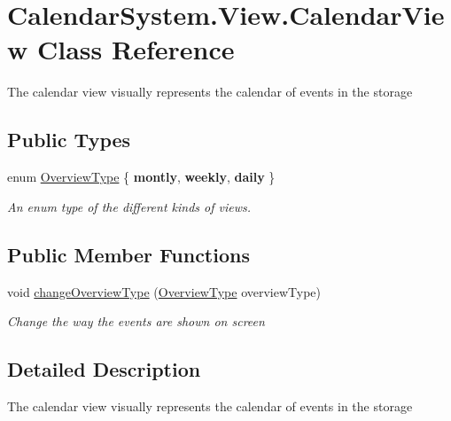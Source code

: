 \hypertarget{class_calendar_system_1_1_view_1_1_calendar_view}{\section{Calendar\+System.\+View.\+Calendar\+View Class Reference}
\label{class_calendar_system_1_1_view_1_1_calendar_view}
}


The calendar view visually represents the calendar of events in the storage  


\subsection*{Public Types}
\begin{DoxyCompactItemize}
\item 
enum \hyperlink{class_calendar_system_1_1_view_1_1_calendar_view_a48613707fc419f439edc9eddc1f81f7e}{Overview\+Type} \{ {\bfseries montly}, 
{\bfseries weekly}, 
{\bfseries daily}
 \}
\begin{DoxyCompactList}\small\item\em An enum type of the different kinds of views. \end{DoxyCompactList}\end{DoxyCompactItemize}
\subsection*{Public Member Functions}
\begin{DoxyCompactItemize}
\item 
void \hyperlink{class_calendar_system_1_1_view_1_1_calendar_view_a879886fb96fcb53e1f647d0ba00dd7d5}{change\+Overview\+Type} (\hyperlink{class_calendar_system_1_1_view_1_1_calendar_view_a48613707fc419f439edc9eddc1f81f7e}{Overview\+Type} overview\+Type)
\begin{DoxyCompactList}\small\item\em Change the way the events are shown on screen \end{DoxyCompactList}\end{DoxyCompactItemize}


\subsection{Detailed Description}
The calendar view visually represents the calendar of events in the storage 



